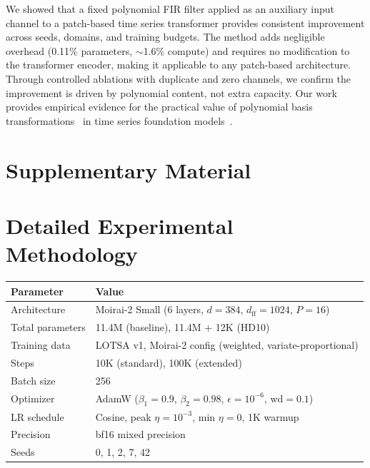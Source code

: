 \documentclass[letterpaper]{article}
\begin{document}
We showed that a fixed polynomial FIR filter applied as an auxiliary input channel to a patch-based time series transformer provides consistent improvement across seeds, domains, and training budgets. The method adds negligible overhead (0.11\% parameters, ${\sim}$1.6\% compute) and requires no modification to the transformer encoder, making it applicable to any patch-based architecture. Through controlled ablations with duplicate and zero channels, we confirm the improvement is driven by polynomial content, not extra capacity. Our work provides empirical evidence for the practical value of polynomial basis transformations~\citep{marsden2024universal,hazan2017learning} in time series foundation models~\citep{liang2024foundation}.

\small



\clearpage
\appendix
\onecolumn
\section*{Supplementary Material}

\section{Detailed Experimental Methodology}
\label{app:methodology}

\begin{center}
\small
\begin{tabular}{ll}
\toprule
\textbf{Parameter} & \textbf{Value} \\
\midrule
Architecture & Moirai-2 Small (6 layers, $d=384$, $d_{\text{ff}}=1024$, $P=16$) \\
Total parameters & 11.4M (baseline), 11.4M + 12K (HD10) \\
Training data & LOTSA v1, Moirai-2 config (weighted, variate-proportional) \\
Steps & 10K (standard), 100K (extended) \\
Batch size & 256 \\
Optimizer & AdamW ($\beta_1=0.9$, $\beta_2=0.98$, $\epsilon=10^{-6}$, wd$=0.1$) \\
LR schedule & Cosine, peak $\eta = 10^{-3}$, min $\eta = 0$, 1K warmup \\
Precision & bf16 mixed precision \\
Seeds & 0, 1, 2, 7, 42 \\
\bottomrule
\end{tabular}
\end{center}
\end{document}
